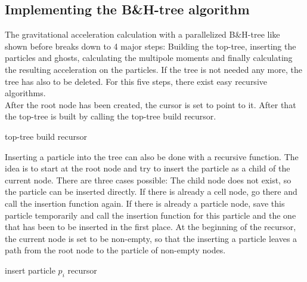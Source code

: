 \subsection{Implementing the B\&H-tree algorithm}
The gravitational acceleration calculation with a parallelized B\&H-tree like shown before breaks down to 4 major steps: Building the top-tree, inserting the particles and ghosts, calculating the multipole moments and finally calculating the resulting acceleration on the particles. If the tree is not needed any more, the tree has also to be deleted. For this five steps, there exist easy recursive algorithms.\\

After the root node has been created, the cursor is set to point to it. After that the top-tree is built by calling the top-tree build recursor.
\begin{algorithm}
\caption{top-tree build recursor}
\begin{algorithmic}
\label{alg:buildtoptree}
\ENDFOR
\ENDIF
\end{algorithmic}
\end{algorithm}

Inserting a particle into the tree can also be done with a recursive function. The idea is to start at the root node and try to insert the particle as a child of the current node. There are three cases possible: The child node does not exist, so the particle can be inserted directly. If there is already a cell node, go there and call the insertion function again. If there is already a particle node, save this particle temporarily and call the insertion function for this particle and the one that has been to be inserted in the first place. At the beginning of the recursor, the current node is set to be non-empty, so that the inserting a particle leaves a path from the root node to the particle of non-empty nodes.
\begin{algorithm}
\caption{insert particle $p_{i}$ recursor}
\begin{algorithmic}
\label{alg:insertparticle}
\ENDIF
\end{algorithmic}
\end{algorithm}\\


